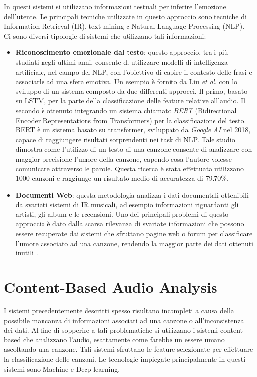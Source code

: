 \documentclass[11pt]{report}
\begin{document}
In questi sistemi si utilizzano informazioni testuali per inferire l'emozione dell'utente. Le principali tecniche utilizzate in questo approccio sono tecniche di Information Retrieval (IR), text mining e Natural Language Processing (NLP). Ci sono diversi tipologie di sistemi che utilizzano tali informazioni:
\begin{itemize}
    \item \textbf{Riconoscimento emozionale dal testo}: questo approccio, tra i più studiati negli ultimi anni, consente di utilizzare modelli di intelligenza artificiale, nel campo del NLP, con l'obiettivo di capire il contesto delle frasi e associarle ad una sfera emotiva. Un esempio è fornito da Liu \textit{et al. }\cite{liu2020research} con lo sviluppo di un sistema composto da due differenti approcci. Il primo, basato su LSTM, per la parte della classificazione delle feature relative all'audio. Il secondo è ottenuto integrando un sistema chiamato \textit{BERT} (Bidirectional Encoder Representations from Transformers)\cite{devlin2018bert} per la classificazione del testo. BERT è un sistema basato su transformer, sviluppato da \textit{Google AI} nel 2018, capace di raggiungere risultati sorprendenti nei task di NLP. Tale studio dimostra come l'utilizzo di un testo di una canzone consente di analizzare con maggior precisione l'umore della canzone, capendo cosa l'autore volesse comunicare attraverso le parole. Questa ricerca è stata effettuata utilizzano 1000 canzoni e raggiunge un risultato medio di accuratezza di 79.70\%.
    
    
    \item \textbf{Documenti Web}: questa metodologia analizza i dati documentali ottenibili da svariati sistemi di IR musicali, ad esempio informazioni riguardanti gli artisti, gli album e le recensioni. Uno dei principali problemi di questo approccio è dato dalla scarsa rilevanza di svariate informazioni che possono essere recuperate dai sistemi che sfruttano pagine web o forum per classificare l'umore associato ad una canzone, rendendo la maggior parte dei dati ottenuti inutili \cite{levy2007semantic}.
    
    
\end{itemize}



\section{Content-Based Audio Analysis}

I sistemi precedentemente descritti spesso risultano incompleti a causa della possibile mancanza di informazioni associati ad una canzone o all'inconsistenza dei dati. Al fine di sopperire a tali problematiche si utilizzano i sistemi content-based che analizzano l'audio, esattamente come farebbe un essere umano ascoltando una canzone. Tali sistemi sfruttano le feature selezionate per effettuare la classificazione delle canzoni. Le tecnologie impiegate principalmente in questi sistemi sono Machine e Deep learning. \\
\end{document}
